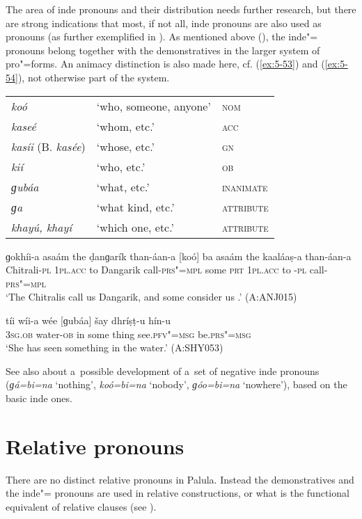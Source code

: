 The area of inde pronouns and their distribution needs further research, but there are strong indications that most, if not all, inde pronouns are also used as  pronouns (as further exemplified in ). As mentioned above (), the inde"= pronouns belong together with the demonstratives in the larger system of pro"=forms. An animacy distinction is also made here, cf. (\ref{ex:5-53}) and (\ref{ex:5-54}), not otherwise part of the  system.

\begin{table}[H]
\begin{tabularx}{\textwidth}{ l l l }
\textit{koó} &
`who, someone, anyone' &
\textsc{nom} \\
\textit{kaseé} &
`whom, etc.' &
\textsc{acc}\\
\textit{kasíi} (B. \textit{kasée}) &
`whose, etc.' &
\textsc{gn} \\
\textit{kií} &
`who, etc.' &
\textsc{ob} \\
\textit{ɡubáa} &
`what, etc.' &
\textsc{inanimate} \\
\textit{ɡa} &
`what kind, etc.' &
\textsc{attribute} \\
\textit{khayú, khayí} &
`which one, etc.' &
\textsc{attribute} \\
\end{tabularx}
\end{table}


\begin{exe}
\ex
\label{ex:5-53}
\gll ɡokhíi-a asaám the ḍanɡarík than-áan-a [koó] ba asaám the kaaláaṣ-a than-áan-a\\
Chitrali-\textsc{pl} \textsc{1pl.acc} to Dangarik call-\textsc{prs"=mpl} some \textsc{prt} \textsc{1pl.acc} to -\textsc{pl} call-\textsc{prs"=mpl}\\
\glt `The Chitralis call us Dangarik, and some consider us .' (A:ANJ015)

\ex
\label{ex:5-54}
\gll tíi wíi-a wée [ɡubáa] šay dhríṣṭ-u hín-u\\
\textsc{3sg.ob} water-\textsc{ob} in some thing see.\textsc{pfv"=msg} be.\textsc{prs"=msg}\\
\glt `She has seen something in the water.' (A:SHY053)
\end{exe}


See also  about a~possible development of a~set of negative inde pronouns (\textit{ɡá=bi=na} `nothing', \textit{koó=bi=na} `nobody', \textit{ɡóo=bi=na} `nowhere'), based on the basic inde ones.

\section{Relative pronouns}
\label{sec:5-8}


There are no distinct relative pronouns in Palula. Instead the demonstratives and the inde"= pronouns are used in relative constructions, or what is the functional equivalent of relative clauses (see ).